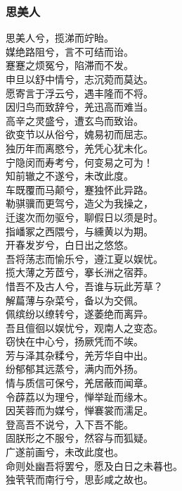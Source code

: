 \documentclass[]{article}
\begin{document}
\hypertarget{header-n2866}{%
\subsubsection{思美人}\label{header-n2866}}

思美人兮，揽涕而竚眙。\\
媒绝路阻兮，言不可结而诒。\\
蹇蹇之烦冤兮，陷滞而不发。\\
申旦以舒中情兮，志沉菀而莫达。\\
愿寄言于浮云兮，遇丰隆而不将。\\
因归鸟而致辞兮，羌迅高而难当。\\
高辛之灵盛兮，遭玄鸟而致诒。\\
欲变节以从俗兮，媿易初而屈志。\\
独历年而离愍兮，羌凭心犹未化。\\
宁隐闵而寿考兮，何变易之可为！\\
知前辙之不遂兮，未改此度。\\
车既覆而马颠兮，蹇独怀此异路。\\
勒骐骥而更驾兮，造父为我操之，\\
迁逡次而勿驱兮，聊假日以须是时。\\
指嶓冢之西隈兮，与纁黄以为期。\\
开春发岁兮，白日出之悠悠。\\
吾将荡志而愉乐兮，遵江夏以娱忧。\\
揽大薄之芳茝兮，搴长洲之宿莽。\\
惜吾不及古人兮，吾谁与玩此芳草？\\
解萹薄与杂菜兮，备以为交佩。\\
佩缤纷以缭转兮，遂萎绝而离异。\\
吾且儃徊以娱忧兮，观南人之变态。\\
窃快在中心兮，扬厥凭而不竢。\\
芳与泽其杂糅兮，羌芳华自中出。\\
纷郁郁其远蒸兮，满内而外扬。\\
情与质信可保兮，羌居蔽而闻章。\\
令薜荔以为理兮，惮举趾而缘木。\\
因芙蓉而为媒兮，惮褰裳而濡足。\\
登高吾不说兮，入下吾不能。\\
固朕形之不服兮，然容与而狐疑。\\
广遂前画兮，未改此度也。\\
命则处幽吾将罢兮，愿及白日之未暮也。\\
独茕茕而南行兮，思彭咸之故也。
\end{document}
